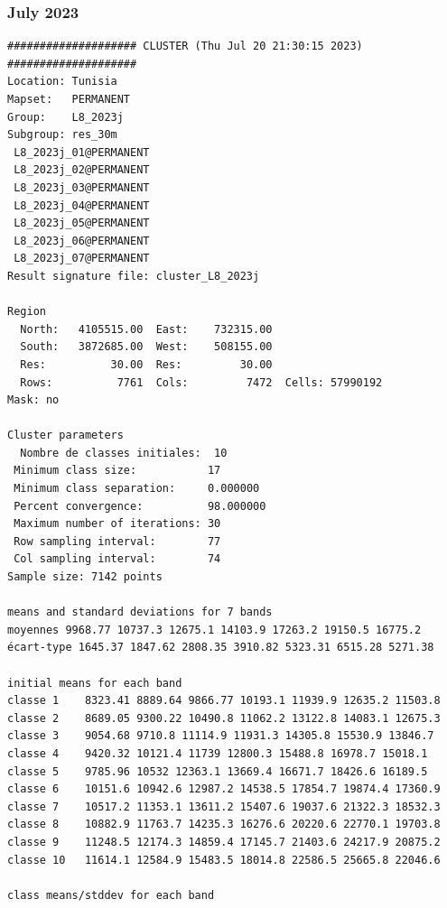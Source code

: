\documentclass[environments,article,submit,pdftex,moreauthors]{Definitions/mdpi}
\begin{document}
\subsubsection[\appendixname~\thesubsubsection]{July 2023}
\begin{scriptsize}
\begin{verbatim}
#################### CLUSTER (Thu Jul 20 21:30:15 2023) ####################
Location: Tunisia
Mapset:   PERMANENT
Group:    L8_2023j
Subgroup: res_30m
 L8_2023j_01@PERMANENT
 L8_2023j_02@PERMANENT
 L8_2023j_03@PERMANENT
 L8_2023j_04@PERMANENT
 L8_2023j_05@PERMANENT
 L8_2023j_06@PERMANENT
 L8_2023j_07@PERMANENT
Result signature file: cluster_L8_2023j

Region
  North:   4105515.00  East:    732315.00
  South:   3872685.00  West:    508155.00
  Res:          30.00  Res:         30.00
  Rows:          7761  Cols:         7472  Cells: 57990192
Mask: no

Cluster parameters
  Nombre de classes initiales: 	10
 Minimum class size:           17
 Minimum class separation:     0.000000
 Percent convergence:          98.000000
 Maximum number of iterations: 30
 Row sampling interval:        77
 Col sampling interval:        74
Sample size: 7142 points

means and standard deviations for 7 bands
moyennes 9968.77 10737.3 12675.1 14103.9 17263.2 19150.5 16775.2
écart-type 1645.37 1847.62 2808.35 3910.82 5323.31 6515.28 5271.38

initial means for each band
classe 1    8323.41 8889.64 9866.77 10193.1 11939.9 12635.2 11503.8
classe 2    8689.05 9300.22 10490.8 11062.2 13122.8 14083.1 12675.3
classe 3    9054.68 9710.8 11114.9 11931.3 14305.8 15530.9 13846.7
classe 4    9420.32 10121.4 11739 12800.3 15488.8 16978.7 15018.1
classe 5    9785.96 10532 12363.1 13669.4 16671.7 18426.6 16189.5
classe 6    10151.6 10942.6 12987.2 14538.5 17854.7 19874.4 17360.9
classe 7    10517.2 11353.1 13611.2 15407.6 19037.6 21322.3 18532.3
classe 8    10882.9 11763.7 14235.3 16276.6 20220.6 22770.1 19703.8
classe 9    11248.5 12174.3 14859.4 17145.7 21403.6 24217.9 20875.2
classe 10   11614.1 12584.9 15483.5 18014.8 22586.5 25665.8 22046.6

class means/stddev for each band


\end{verbatim}
\end{scriptsize}
\end{document}
